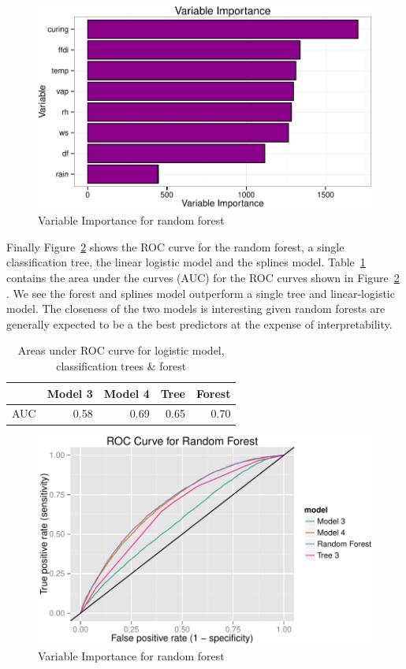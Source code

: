 \documentclass[11pt,a4paper]{article}
\begin{document}
\begin{figure}
  \centering
  	\includegraphics[width=.7\textwidth]{figures/varimp.pdf}
  \caption{Variable Importance for random forest}
  \label{fig:vimp}
\end{figure}

Finally Figure~\ref{fig:rocrf} shows the ROC curve for the random forest, a single classification tree, the linear logistic model and the splines model. Table~\ref{table:AUC} contains the area under the curves (AUC) for the ROC curves shown in Figure~\ref{fig:rocrf} . We see the forest and splines model outperform a single tree and linear-logistic model. The closeness of the two models is interesting given random forests are generally expected to be a the best predictors at the expense of interpretability.

\begin{table}
  \centering
  \begin{tabular}{r|rrrr}
    \toprule
        & Model 3 & Model 4 & Tree & Forest \\
    \midrule
    AUC & 0.58    & 0.69    & 0.65 & 0.70 \\
    \midrule
  \end{tabular}
  \caption{Areas under ROC curve for logistic model, classification trees \& forest}
  \label{table:AUC}
\end{table}

\begin{figure}
  \centering
	\includegraphics[width=.8\textwidth]{figures/roc_rf.pdf}
  \caption{Variable Importance for random forest}
  \label{fig:rocrf}
\end{figure}
\end{document}
